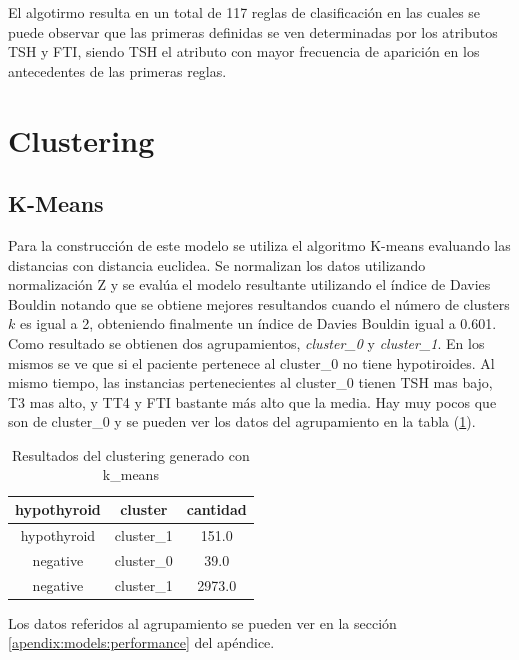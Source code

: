 \documentclass[osajnl,twocolumn,showpacs,superscriptaddress,10pt,floatfix]{revtex4-1} %
\begin{document}
El algotirmo resulta en un total de 117 reglas de clasificación en las cuales se puede observar que las primeras definidas se ven determinadas por los atributos TSH y FTI, siendo TSH el atributo con mayor frecuencia de aparición en los antecedentes de las primeras reglas.

\section{Clustering}

\subsection{K-Means}

Para la construcción de este modelo se utiliza el algoritmo K-means evaluando las distancias con distancia euclidea. Se normalizan los datos utilizando normalización Z y se evalúa el modelo resultante utilizando el índice de Davies Bouldin notando que se obtiene mejores resultandos cuando el número de clusters $k$ es igual a 2, obteniendo finalmente un índice de Davies Bouldin igual a 0.601. \\

Como resultado se obtienen dos agrupamientos, \textit{cluster\_0} y \textit{cluster\_1}. En los mismos se ve que si el paciente pertenece al cluster\_0 no tiene hypotiroides. Al mismo tiempo, las instancias pertenecientes al cluster\_0 tienen TSH mas bajo, T3 mas alto, y TT4 y FTI bastante más alto que la media. Hay muy pocos que son de cluster\_0 y se pueden ver los datos del agrupamiento en la tabla (\ref{table:k_means}).


\begin{table}[h!]
    \centering
    \begin{tabular}{ccc}
        hypothyroid & cluster & cantidad \\
        \hline
        hypothyroid & cluster\_1 & 151.0 \\
        negative & cluster\_0 & 39.0 \\
        negative  & cluster\_1 & 2973.0 \\
        \hline
    \end{tabular}
    \caption{Resultados del clustering generado con k\_means}
    \label{table:k_means}
\end{table}

Los datos referidos al agrupamiento se pueden ver  en la sección \ref{apendix:models:performance} del apéndice. \\
\end{document}
